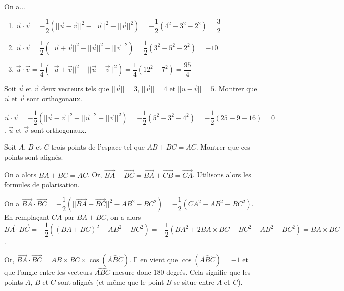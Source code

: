 \documentclass[11pt,fleqn, openany]{book} %
\begin{document}
\begin{solution} On a...
\begin{enumerate}
\item $\vec{u} \cdot \vec{v}= -\dfrac{1}{2}(\lvert\lvert\vec{u}-\vec{v}\rvert\rvert^2-\lvert\lvert\vec{u}\rvert\rvert^2-\lvert\lvert\vec{v}\rvert\rvert^2)=-\dfrac{1}{2}(4^2-3^2-2^2)=\dfrac{3}{2}$
\vskip5pt
\item $\vec{u} \cdot \vec{v}= \dfrac{1}{2}(\lvert\lvert\vec{u}+\vec{v}\rvert\rvert^2-\lvert\lvert\vec{u}\rvert\rvert^2-\lvert\lvert\vec{v}\rvert\rvert^2)=\dfrac{1}{2}(3^2-5^2-2^2)=-10$
\vskip5pt
\item $\vec{u} \cdot \vec{v} = \dfrac{1}{4}( \lvert\lvert\vec{u}+\vec{v}\rvert\rvert^2-\lvert\lvert\vec{u}-\vec{v}\rvert\rvert^2 )=\dfrac{1}{4}(12^2-7^2)=\dfrac{95}{4}$
\end{enumerate}\end{solution}



\begin{exercise}Soit $\vec u$ et $\vec v$ deux vecteurs tels que $\lvert\lvert\vec{u}\rvert\rvert=3$, $\lvert\lvert\vec{v}\rvert\rvert=4$ et $\lvert\lvert\vec{u-v}\rvert\rvert=5$. Montrer que $\vec u$ et $\vec v$ sont orthogonaux.\end{exercise}

\begin{solution}$\vec u \cdot \vec v = -\dfrac{1}{2}(\lvert\lvert\vec{u}-\vec{v}\rvert\rvert^2-\lvert\lvert\vec{u}\rvert\rvert^2-\lvert\lvert\vec{v}\rvert\rvert^2)=-\dfrac{1}{2}(5^2-3^2-4^2)=-\dfrac{1}{2}(25-9-16)=0$. $\vec u$ et $\vec v$ sont orthogonaux.\end{solution}




\begin{exercise}Soit $A$, $B$ et $C$ trois points de l'espace tel que $AB+BC=AC$. Montrer que ces points sont alignés.\end{exercise}

\begin{solution}On a alors $BA + BC = AC$. Or, $\overrightarrow{BA}-\overrightarrow{BC}=\overrightarrow{BA}+\overrightarrow{CB}=\overrightarrow{CA}$. Utilisons alors les formules de polarisation.

On a $\overrightarrow{BA}\cdot\overrightarrow{BC}=-\dfrac{1}{2}(\lvert\lvert\overrightarrow{BA}-\overrightarrow{BC}\rvert\rvert^2-AB^2-BC^2)=-\dfrac{1}{2}(CA^2-AB^2-BC^2)$. En remplaçant $CA$ par $BA+BC$, on a alors $\overrightarrow{BA} \cdot \overrightarrow{BC} = -\dfrac{1}{2}((BA+BC)^2-AB^2-BC^2)=-\dfrac{1}{2}(BA^2+2BA \times BC+BC^2-AB^2-BC^2)=BA \times BC$.

Or, $\overrightarrow{BA} \cdot \overrightarrow{BC} = AB \times BC \times \cos (\widehat{ABC})$. Il en vient que $\cos (\widehat{ABC})=-1$ et que l'angle entre les vecteurs $\widehat{ABC}$ mesure donc 180 degrés. Cela signifie que les points $A$, $B$ et $C$ sont alignés (et même que le point $B$ se situe entre $A$ et $C$).\end{solution}
\end{document}
